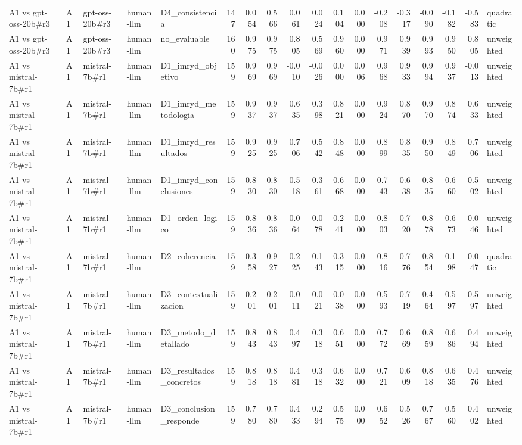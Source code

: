 \begin{table}
{\begin{tabular}{lllllrrrrrrrrrrrrl}
A1 vs gpt-oss-20b\#r3 & A1 & gpt-oss-20b\#r3 & human-llm & D4\_consistencia & 147 & 0.054 & 0.566 & 0.061 & 0.024 & 0.104 & 0.000 & -0.208 & -0.317 & -0.090 & -0.182 & -0.583 & quadratic \\
A1 vs gpt-oss-20b\#r3 & A1 & gpt-oss-20b\#r3 & human-llm & no\_evaluable & 160 & 0.975 & 0.975 & 0.805 & 0.569 & 0.960 & 0.000 & 0.971 & 0.939 & 0.993 & 0.950 & 0.805 & unweighted \\
A1 vs mistral-7b\#r1 & A1 & mistral-7b\#r1 & human-llm & D1\_imryd\_objetivo & 159 & 0.969 & 0.969 & -0.010 & -0.026 & 0.000 & 0.006 & 0.968 & 0.933 & 0.994 & 0.937 & -0.013 & unweighted \\
A1 vs mistral-7b\#r1 & A1 & mistral-7b\#r1 & human-llm & D1\_imryd\_metodologia & 159 & 0.937 & 0.937 & 0.635 & 0.398 & 0.821 & 0.000 & 0.924 & 0.870 & 0.970 & 0.874 & 0.633 & unweighted \\
A1 vs mistral-7b\#r1 & A1 & mistral-7b\#r1 & human-llm & D1\_imryd\_resultados & 159 & 0.925 & 0.925 & 0.706 & 0.542 & 0.848 & 0.000 & 0.899 & 0.835 & 0.950 & 0.849 & 0.706 & unweighted \\
A1 vs mistral-7b\#r1 & A1 & mistral-7b\#r1 & human-llm & D1\_imryd\_conclusiones & 159 & 0.830 & 0.830 & 0.518 & 0.361 & 0.668 & 0.000 & 0.743 & 0.638 & 0.835 & 0.660 & 0.502 & unweighted \\
A1 vs mistral-7b\#r1 & A1 & mistral-7b\#r1 & human-llm & D1\_orden\_logico & 159 & 0.836 & 0.836 & 0.064 & -0.078 & 0.241 & 0.000 & 0.803 & 0.720 & 0.878 & 0.673 & 0.046 & unweighted \\
A1 vs mistral-7b\#r1 & A1 & mistral-7b\#r1 & human-llm & D2\_coherencia & 159 & 0.358 & 0.927 & 0.225 & 0.143 & 0.315 & 0.000 & 0.816 & 0.776 & 0.854 & 0.198 & 0.047 & quadratic \\
A1 vs mistral-7b\#r1 & A1 & mistral-7b\#r1 & human-llm & D3\_contextualizacion & 159 & 0.201 & 0.201 & 0.011 & -0.021 & 0.038 & 0.000 & -0.593 & -0.719 & -0.464 & -0.597 & -0.597 & unweighted \\
A1 vs mistral-7b\#r1 & A1 & mistral-7b\#r1 & human-llm & D3\_metodo\_detallado & 159 & 0.843 & 0.843 & 0.497 & 0.318 & 0.651 & 0.000 & 0.772 & 0.669 & 0.859 & 0.686 & 0.494 & unweighted \\
A1 vs mistral-7b\#r1 & A1 & mistral-7b\#r1 & human-llm & D3\_resultados\_concretos & 159 & 0.818 & 0.818 & 0.481 & 0.318 & 0.632 & 0.000 & 0.721 & 0.609 & 0.818 & 0.635 & 0.476 & unweighted \\
A1 vs mistral-7b\#r1 & A1 & mistral-7b\#r1 & human-llm & D3\_conclusion\_responde & 159 & 0.780 & 0.780 & 0.433 & 0.294 & 0.575 & 0.000 & 0.652 & 0.526 & 0.767 & 0.560 & 0.402 & unweighted \\

\end{tabular}}
\end{table}
